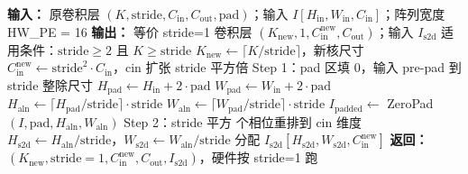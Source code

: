 \documentclass[border=4pt,varwidth=18cm]{standalone}
\begin{document}
\begin{algorithm}[H]
{\bfseries 输入：} 原卷积层 $(K, \text{stride}, C_\text{in}, C_\text{out}, \text{pad})$；输入 $I[H_\text{in}, W_\text{in}, C_\text{in}]$；阵列宽度 HW\_PE = 16\;
{\bfseries 输出：} 等价 stride=1 卷积层 $(K_\text{new}, 1, C_\text{in}^\text{new}, C_\text{out})$；输入 $I_\text{s2d}$\;
\BlankLine
适用条件：$\text{stride} \geq 2$ 且 $K \geq \text{stride}$\;
\BlankLine
$K_\text{new} \leftarrow \lceil K / \text{stride} \rceil$，新核尺寸\;
$C_\text{in}^\text{new} \leftarrow \text{stride}^2 \cdot C_\text{in}$，cin 扩张 stride 平方倍\;
\BlankLine
Step 1：pad 区填 0，输入 pre-pad 到 stride 整除尺寸\;
$H_\text{pad} \leftarrow H_\text{in} + 2 \cdot \text{pad}$\;
$W_\text{pad} \leftarrow W_\text{in} + 2 \cdot \text{pad}$\;
$H_\text{aln} \leftarrow \lceil H_\text{pad} / \text{stride} \rceil \cdot \text{stride}$\;
$W_\text{aln} \leftarrow \lceil W_\text{pad} / \text{stride} \rceil \cdot \text{stride}$\;
$I_\text{padded} \leftarrow$ ZeroPad$(I, \text{pad}, H_\text{aln}, W_\text{aln})$\;
\BlankLine
Step 2：stride 平方 个相位重排到 cin 维度\;
$H_\text{s2d} \leftarrow H_\text{aln} / \text{stride}$，$W_\text{s2d} \leftarrow W_\text{aln} / \text{stride}$\;
分配 $I_\text{s2d}[H_\text{s2d}, W_\text{s2d}, C_\text{in}^\text{new}]$\;
\BlankLine
{\bfseries 返回：} $(K_\text{new}, \text{stride}=1, C_\text{in}^\text{new}, C_\text{out}, I_\text{s2d})$，硬件按 stride=1 跑\;
\end{algorithm}
\end{document}
